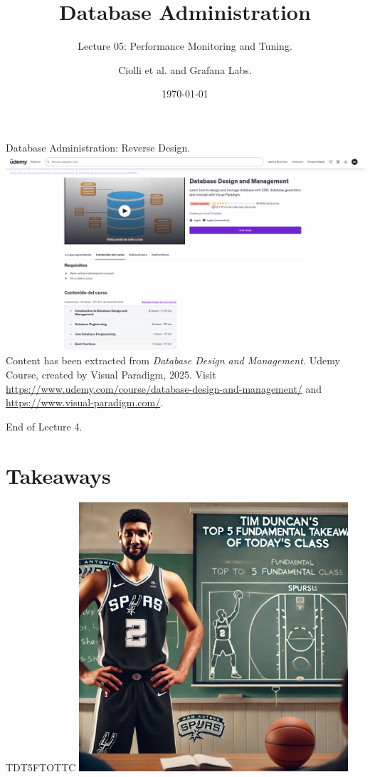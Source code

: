 \documentclass{beamer}
\title[Monitoring]{Database Administration}
\subtitle{Lecture 05: Performance Monitoring and Tuning.}
\author{Ciolli et al. and Grafana Labs.}
\date{\today}
\begin{document}
\frame{\titlepage}

\begin{frame}{Database Administration: Reverse Design.}
    \centering
    \includegraphics[width=\textwidth]{figures/udemy2}\\
    \includegraphics[width=\textwidth]{figures/udemy3}\\
    \vspace{2mm}
    {
        \scriptsize
        Content has been extracted from \textit{Database Design and Management.} Udemy Course, created by Visual Paradigm, 2025.  Visit \url{https://www.udemy.com/course/database-design-and-management/} and \url{https://www.visual-paradigm.com/}.\\
    }
\end{frame}


\begin{frame}{}
    \centering
    \Huge End of Lecture 4.
\end{frame}

\section*{Takeaways}

\begin{frame}{TDT5FTOTTC}
    \centering
    \includegraphics[width=0.75\textwidth]{figures/tim.png}
\end{frame}
\end{document}
